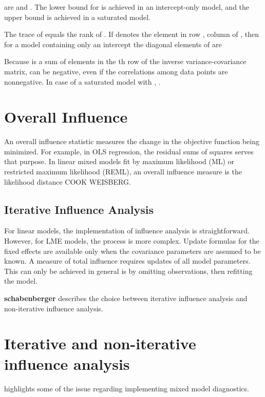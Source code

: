 \documentclass[12pt, a4paper]{article}
\begin{document}
are  and . The lower bound for  is achieved in an intercept-only model, and the upper bound is achieved in a saturated model. 

The trace of  equals the rank of .
If  denotes the element in row , column  of , then for a model containing only an intercept the diagonal elements of  are

Because  is a sum of elements in the th row of the inverse variance-covariance matrix,  can be negative, even if the correlations among data points are nonnegative. In case of a saturated model with , .			
			

	



\section{Overall Influence}
An overall influence statistic measures the change in the objective function being minimized. For example, in
OLS regression, the residual sums of squares serves that purpose. In linear mixed models fit by
 maximum likelihood (ML) or  restricted maximum likelihood (REML), an overall influence measure is the  likelihood distance COOK WEISBERG.



\subsection{Iterative Influence Analysis}

For linear models, the implementation of influence analysis is straightforward.
However, for LME models, the process is more complex. Update formulas for the fixed effects are available only when the covariance parameters are assumed to be known. A measure of total influence requires updates of all model parameters.
This can only be achieved in general is by omitting observations, then refitting the model.

\textbf{schabenberger} describes the choice between  iterative influence analysis and  non-iterative influence analysis.






\section{Iterative and non-iterative influence analysis} %
\citet{schabenberger} highlights some of the issue regarding implementing mixed model diagnostics.
\end{document}
